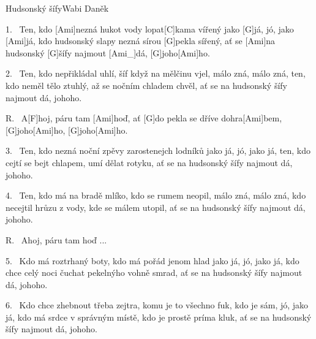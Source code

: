 \begin{song}{Hudsonský šífy}{Wabi Daněk}

\begin{xverse}{1.~}
Ten, kdo [\large Ami]nezná hukot vody lopat[\large C]kama vířený
jako [\large G]já, jó, jako [\large Ami]já,
kdo hudsonský slapy nezná sírou [\large G]pekla sířený,
ať se [\large Ami]na hudsonský [\large G]{}šífy najmout [\large Ami_]{dá}, [\large G]joho[\large Ami]ho.
\end{xverse}

\begin{xverse}{2.~}
Ten, kdo nepřikládal uhlí, šíf když na mělčinu vjel,
málo zná, málo zná,
ten, kdo neměl tělo ztuhlý, až se nočním chladem chvěl,
ať se na hudsonský šífy najmout dá, johoho.
\end{xverse}

\begin{xverse}{R.~}
A[\large F]hoj, páru tam [\large Ami]hoď,
ať [\large G]do pekla se dříve dohra[\large Ami]bem,
[\large G]joho[\large Ami]ho,  [\large G]joho[\large Ami]ho.
\end{xverse}

\begin{xverse}{3.~}
Ten, kdo nezná noční zpěvy zarostenejch lodníků
jako já, jó, jako já,
ten, kdo cejtí se bejt chlapem, umí dělat rotyku,
ať se na hudsonský šífy najmout dá, johoho.
\end{xverse}

\begin{xverse}{4.~}
Ten, kdo má na bradě mlíko, kdo se rumem neopil,
málo zná, málo zná,
kdo necejtil hrůzu z vody, kde se málem utopil,
ať se na hudsonský šífy najmout dá, johoho.
\end{xverse}

\begin{xverse}{R.~}
Ahoj, páru tam hoď ...
\end{xverse}

\begin{xverse}{5.~}
Kdo má roztrhaný boty, kdo má pořád jenom hlad
jako já, jó, jako já,
kdo chce celý noci čuchat pekelnýho vohně smrad,
ať se na hudsonský šífy najmout dá, johoho.
\end{xverse}

\begin{xverse}{6.~}
Kdo chce zhebnout třeba zejtra, komu je to všechno fuk,
kdo je sám, jó, jako já,
kdo má srdce v správným místě, kdo je prostě príma kluk,
ať se na hudsonský šífy najmout dá, johoho.
\end{xverse}

\end{song}

